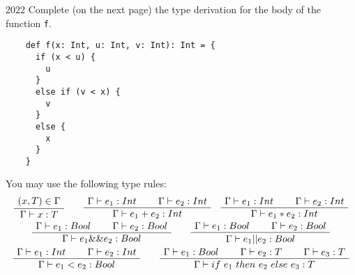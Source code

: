 
\begin{exercise}{2022}
  Complete (on the next page) the type derivation for the body of the function
  \lstinline|f|.

  \begin{lstlisting}
    def f(x: Int, u: Int, v: Int): Int = {
      if (x < u) {
        u
      }
      else if (v < x) {
        v
      }
      else {
        x
      }
    }
  \end{lstlisting}

  You may use the following type rules:
  \addtolength{\jot}{2em}
  \begin{gather*}
    \AxiomC{\((x, T) \in \Gamma\)}
    \UnaryInfC{\(\Gamma \vdash x : T\)}
    \DisplayProof 
    \qquad
    \AxiomC{\(\Gamma \vdash e_1 : Int\)}
    \AxiomC{\(\Gamma \vdash e_2 : Int\)}
    \BinaryInfC{\(\Gamma \vdash e_1 + e_2 : Int\)}
    \DisplayProof
    \quad
    \AxiomC{\(\Gamma \vdash e_1 : Int\)}
    \AxiomC{\(\Gamma \vdash e_2 : Int\)}
    \BinaryInfC{\(\Gamma \vdash e_1 * e_2 : Int\)}
    \DisplayProof
    \\
    \AxiomC{\(\Gamma \vdash e_1 : Bool\)}
    \AxiomC{\(\Gamma \vdash e_2 : Bool\)}
    \BinaryInfC{\(\Gamma \vdash e_1 \&\& e_2 : Bool\)}
    \DisplayProof
    \qquad
    \AxiomC{\(\Gamma \vdash e_1 : Bool\)}
    \AxiomC{\(\Gamma \vdash e_2 : Bool\)}
    \BinaryInfC{\(\Gamma \vdash e_1 || e_2 : Bool\)}
    \DisplayProof
    \\
    \AxiomC{\(\Gamma \vdash e_1 : Int\)}
    \AxiomC{\(\Gamma \vdash e_2 : Int\)}
    \BinaryInfC{\(\Gamma \vdash e_1 < e_2 : Bool\)}
    \DisplayProof
    \qquad
    \AxiomC{\(\Gamma \vdash e_1 : Bool\)}
    \AxiomC{\(\Gamma \vdash e_2 : T\)}
    \AxiomC{\(\Gamma \vdash e_3 : T\)}
    \TrinaryInfC{\(\Gamma \vdash if~e_1~then~e_2~else~e_3 : T\)}
    \DisplayProof
  \end{gather*}

  \pagebreak
  \begin{center}
  \end{center}
\end{exercise}

